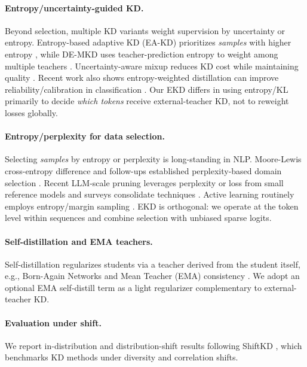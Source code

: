 \documentclass[11pt]{article}
\begin{document}
\paragraph{Entropy/uncertainty-guided KD.} Beyond selection, multiple KD variants weight supervision by uncertainty or entropy. Entropy-based adaptive KD (EA-KD) prioritizes \emph{samples} with higher entropy \citep{su2023eakd}, while DE-MKD uses teacher-prediction entropy to weight among multiple teachers \citep{cheng2024demkd}. Uncertainty-aware mixup reduces KD cost while maintaining quality \citep{xu2023unix}. Recent work also shows entropy-weighted distillation can improve reliability/calibration in classification \citep{guo2024entropykd}. Our EKD differs in using entropy/KL primarily to decide \emph{which tokens} receive external-teacher KD, not to reweight losses globally.

\paragraph{Entropy/perplexity for data selection.} Selecting \emph{samples} by entropy or perplexity is long-standing in NLP. Moore-Lewis cross-entropy difference and follow-ups established perplexity-based domain selection \citep{moore2010cediff,axelrod2015few,axelrod2017cynical}. Recent LLM-scale pruning leverages perplexity or loss from small reference models \citep{ankner2022perplexprune} and surveys consolidate techniques \citep{datasel2024survey}. Active learning routinely employs entropy/margin sampling \citep{zhang2022alsurvey}. EKD is orthogonal: we operate at the token level within sequences and combine selection with unbiased sparse logits.

\paragraph{Self-distillation and EMA teachers.} Self-distillation regularizes students via a teacher derived from the student itself, e.g., Born-Again Networks \citep{furlanello2018ban} and Mean Teacher (EMA) consistency \citep{tarvainen2017meanteacher}. We adopt an optional EMA self-distill term as a light regularizer complementary to external-teacher KD.

\paragraph{Evaluation under shift.} We report in-distribution and distribution-shift results following ShiftKD \citep{zhang2023shiftkd}, which benchmarks KD methods under diversity and correlation shifts.
\end{document}
